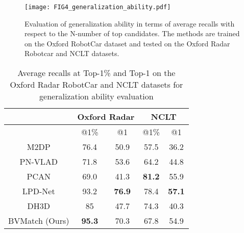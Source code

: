\documentclass[letterpaper, 10 pt, journal, twoside]{IEEEtran}
\begin{document}
\begin{figure}
    \centering
    \texttt{[image: FIG4\_generalization\_ability.pdf]}
    \caption{Evaluation of generalization ability in terms of average recalls with respect to the N-number of top candidates. The methods are trained on the Oxford RobotCar dataset and tested on the Oxford Radar Robotcar and NCLT datasets.}
    \label{fig:generalization_ability} %
\end{figure}


\begin{table}[!htb]
	\renewcommand\arraystretch{1.2}
	\renewcommand\tabcolsep{5pt}
	\newcommand{\tabincell}[2]{\begin{tabular}{@{}#1@{}}#2\end{tabular}}
	\begin{center}
		\caption{Average recalls at Top-1\% and Top-1 on the Oxford Radar RobotCar and NCLT datasets for generalization ability evaluation}
		\label{table: generalization}
		\begin{tabular}{|c|c|c|c|c|}
			\hline\hline
			& \multicolumn{2}{c|}{Oxford Radar} & \multicolumn{2}{c|}{NCLT} \\ \hline
			& @1\%        &  @1       &  @1\%           &  @1          \\ \hline
			M2DP \cite{he2016m2dp}    & 76.4         & 50.9    & 57.5         & 36.2      \\ \hline
			PN-VLAD \cite{angelina2018pointnetvlad} & 71.8                      & 53.6                   & 64.2                   & 44.8                \\ \hline
			PCAN \cite{zhang2019pcan} & 69.0  & 41.3  & \textbf{81.2}      & 55.9                \\ \hline
			LPD-Net \cite{liu2019lpd} & 93.2    & \textbf{76.9}   & {78.4}      & \textbf{57.1}    \\ \hline
			DH3D \cite{du2020dh3d} & 85   & 47.7      & 74.3      & 40.3      \\ \hline
			BVMatch (Ours) & \textbf{95.3}             & {70.3}          & {67.8}          & {54.9}       \\ 
			\hline \hline 
		\end{tabular}
	\end{center}
\end{table}
\end{document}
